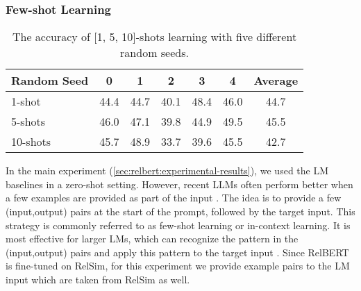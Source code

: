 \documentclass[3p]{elsarticle}
\begin{document}
{\subsubsection{Few-shot Learning} \label{sec:relbert:fewshot-learning}

\begin{table}[!t]
\centering
\begin{tabular}{lcccccc}
\toprule
Random Seed &     0 &     1 &     2 &     3 &     4 &  Average \\
\midrule
1-shot  &  44.4 &  44.7 &  40.1 &  48.4 &  46.0 &     44.7 \\
5-shots  &  46.0 &  47.1 &  39.8 &  44.9 &  49.5 &     45.5 \\
10-shots &  45.7 &  48.9 &  33.7 &  39.6 &  45.5 &     42.7 \\
\bottomrule
\end{tabular}
\caption{The accuracy of [1, 5, 10]-shots learning with five different random seeds.}
\label{fig:relbert:few-shot}
\end{table}

In the main experiment (\autoref{sec:relbert:experimental-results}), we used the LM baselines in a zero-shot setting. However, recent LLMs often perform better when a few examples are provided as part of the input \cite{GPT3,https://doi.org/10.48550/arxiv.2210.11416}. 
The idea is to provide a few (input,output) pairs at the start of the prompt, followed by the target input. This strategy is commonly referred to as few-shot learning or in-context learning. It is most effective for larger LMs, which can recognize the pattern in the (input,output) pairs and apply this pattern to the target input \cite{https://doi.org/10.48550/arxiv.2210.11416,zhang2022opt,iyer2022opt}. Since RelBERT is fine-tuned on RelSim, for this experiment we provide example pairs to the LM input which are taken from RelSim as well.

}
\end{document}
